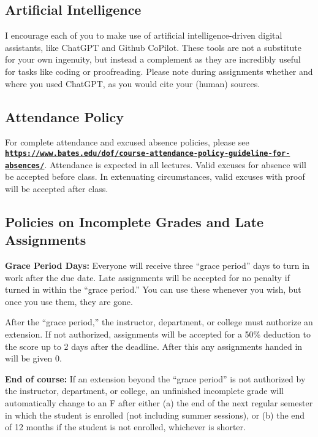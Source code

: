 \documentclass[11pt]{article}
\begin{document}
\subsection*{Artificial Intelligence}
\footnotesize{I encourage each of you to make use of artificial intelligence-driven digital assistants, like ChatGPT and Github CoPilot. These tools are not a substitute for your own ingenuity, but instead a complement as they are incredibly useful for tasks like coding or proofreading. Please note during assignments whether and where you used ChatGPT, as you would cite your (human) sources.}

\subsection*{Attendance Policy}
\footnotesize{For complete attendance and excused absence policies, please see \href{https://www.bates.edu/dof/course-attendance-policy-guideline-for-absences/}{\tt\bf https://www.bates.edu/dof/course-attendance-policy-guideline-for-absences/}. Attendance is expected in all lectures. Valid excuses for absence will be accepted before class. In extenuating circumstances, valid excuses with proof will be accepted after class.}

\subsection*{Policies on Incomplete Grades and Late Assignments}
\footnotesize{\textbf{Grace Period Days:} Everyone will receive three ``grace period'' days to turn in work after the due date. Late assignments will be accepted for no penalty if turned in within the ``grace period.'' You can use these whenever you wish, but once you use them, they are gone.}

\footnotesize{After the ``grace period,'' the instructor, department, or college must authorize an extension. If not authorized, assignments will be accepted for a 50\% deduction to the score up to 2 days after the deadline. After this any assignments handed in will be given 0.}

\footnotesize{\textbf{End of course:} If an extension beyond the ``grace period'' is not authorized by the instructor, department, or college, an unfinished incomplete grade will automatically change to an F after either (a) the end of the next regular semester in which the student is enrolled (not including summer sessions), or (b) the end of 12 months if the student is not enrolled, whichever is shorter.}
\end{document}
